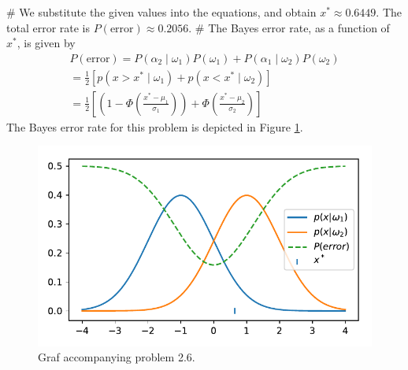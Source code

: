 \documentclass[12pt, a4paper]{article}
\begin{document}
\begin{easylist}[enumerate]
# We substitute the given values into the equations, and obtain $x^* \approx 0.6449$. The total error rate is $P(\text{error}) \approx 0.2056$.
# The Bayes error rate, as a function of $x^*$, is given by
\begin{align*}
	P(\text{error}) = P(\alpha_2  \mid  \omega_1) P(\omega_1) + P(\alpha_1 \mid  \omega_2) P(\omega_2) \\
	= \frac{1}{2} \left[ p( x > x^* \mid  \omega_1)  + p( x < x^*  \mid  \omega_2) \right]   \\
	= \frac{1}{2} \left[ \left( 1 - \Phi \left( \frac{x^* - \mu_1}{\sigma_1}\right)\right) +  \Phi \left( \frac{x^* - \mu_2}{\sigma_2}\right)  \right]
\end{align*}
The Bayes error rate for this problem is depicted in Figure \ref{fig:duda_ch2_prob6}.

\begin{figure}[ht!]
\centering
\includegraphics[width=0.5\linewidth]{figs/duda_ch2_prob6}
\caption{Graf accompanying problem 2.6.}
\label{fig:duda_ch2_prob6}
\end{figure}


\end{easylist}
\end{document}
